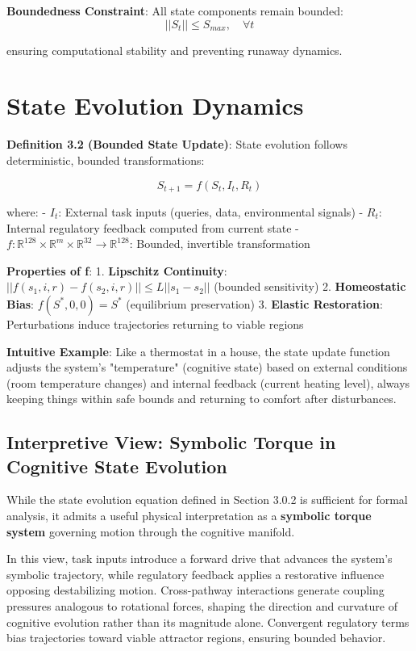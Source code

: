 \documentclass[12pt,a4paper]{report}
\begin{document}
\textbf{Boundedness Constraint}: All state components remain bounded:
\[||S_t|| \leq S_{max}, \quad \forall t\]

ensuring computational stability and preventing runaway dynamics.

\section{State Evolution Dynamics}

\textbf{Definition 3.2 (Bounded State Update)}: State evolution follows deterministic, bounded transformations:

\[S_{t+1} = f(S_t, I_t, R_t)\]

where:
- $I_t$: External task inputs (queries, data, environmental signals)
- $R_t$: Internal regulatory feedback computed from current state
- $f: \mathbb{R}^{128} \times \mathbb{R}^m \times \mathbb{R}^{32} \rightarrow \mathbb{R}^{128}$: Bounded, invertible transformation

\textbf{Properties of f}:
1. \textbf{Lipschitz Continuity}: $||f(s_1, i, r) - f(s_2, i, r)|| \leq L||s_1 - s_2||$ (bounded sensitivity)
2. \textbf{Homeostatic Bias}: $f(S^*, 0, 0) = S^*$ (equilibrium preservation)
3. \textbf{Elastic Restoration}: Perturbations induce trajectories returning to viable regions

\textbf{Intuitive Example}: Like a thermostat in a house, the state update function adjusts the system's "temperature" (cognitive state) based on external conditions (room temperature changes) and internal feedback (current heating level), always keeping things within safe bounds and returning to comfort after disturbances.

\subsection{Interpretive View: Symbolic Torque in Cognitive State Evolution}

While the state evolution equation defined in Section 3.0.2 is sufficient for formal analysis, it admits a useful physical interpretation as a \textbf{symbolic torque system} governing motion through the cognitive manifold.

In this view, task inputs introduce a forward drive that advances the system's symbolic trajectory, while regulatory feedback applies a restorative influence opposing destabilizing motion. Cross-pathway interactions generate coupling pressures analogous to rotational forces, shaping the direction and curvature of cognitive evolution rather than its magnitude alone. Convergent regulatory terms bias trajectories toward viable attractor regions, ensuring bounded behavior.
\end{document}
